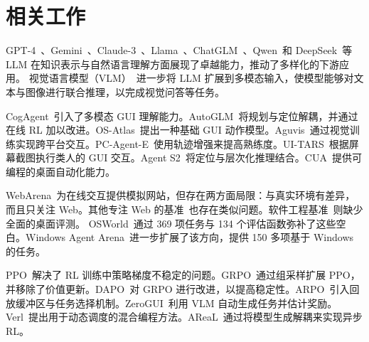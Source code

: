 \section{相关工作}

GPT-4~\citep{achiam2023gpt}、Gemini~\citep{team2023gemini}、Claude-3~\citep{claude2}、Llama~\citep{touvron2023llama}、ChatGLM~\citep{zeng2022glm,du2022glm}、Qwen~\citep{bai2023qwen,team2024qwen2}和 DeepSeek~\citep{liu2024deepseek,guo2025deepseek}等 LLM 在知识表示与自然语言理解方面展现了卓越能力，推动了多样化的下游应用。
视觉语言模型（VLM）~\citep{hong2023cogagent,hong2025glm,bai2023qwen-vl,hurst2024gpt}进一步将 LLM 扩展到多模态输入，使模型能够对文本与图像进行联合推理，以完成视觉问答等任务。

CogAgent~\citep{hong2023cogagent}引入了多模态 GUI 理解能力。AutoGLM~\citep{liu2024autoglm}将规划与定位解耦，并通过在线 RL 加以改进。OS-Atlas~\citep{wu2024atlas}提出一种基础 GUI 动作模型。Aguvis~\citep{xu2024aguvis}通过视觉训练实现跨平台交互。PC-Agent-E~\citep{he2025efficient}使用轨迹增强来提高熟练度。UI-TARS~\citep{qin2025ui}根据屏幕截图执行类人的 GUI 交互。Agent S2~\citep{agashe2025agent}将定位与层次化推理结合。CUA~\citep{cua2025}提供可编程的桌面自动化能力。

WebArena~\citep{zhou2023webarena}为在线交互提供模拟网站，但存在两方面局限：与真实环境有差异，而且只关注 Web。其他专注 Web 的基准~\citep{yao2022webshop,koh2024visualwebarena,chezelles2024browsergym,miyai2025webchorearena}也存在类似问题。软件工程基准~\citep{jimenez2023swe,yang2024swe,li2024devbench,zan2025multi,padigela2025ml}则缺少全面的桌面评测。
OSWorld~\citep{xie2024osworld}通过 369 项任务与 134 个评估函数弥补了这些空白。Windows Agent Arena~\citep{bonatti2024windows}进一步扩展了该方向，提供 150 多项基于 Windows 的任务。

PPO~\citep{schulman2017proximal}解决了 RL 训练中策略梯度不稳定的问题。GRPO~\citep{guo2025deepseek}通过组采样扩展 PPO，并移除了价值更新。DAPO~\citep{yu2025dapo}对 GRPO 进行改进，以提高稳定性。ARPO~\citep{lu2025arpo}引入回放缓冲区与任务选择机制。ZeroGUI~\citep{yang2025zerogui}利用 VLM 自动生成任务并估计奖励。Verl~\citep{sheng2025hybridflow}提出用于动态调度的混合编程方法。AReaL~\citep{fu2025areal}通过将模型生成解耦来实现异步 RL。
